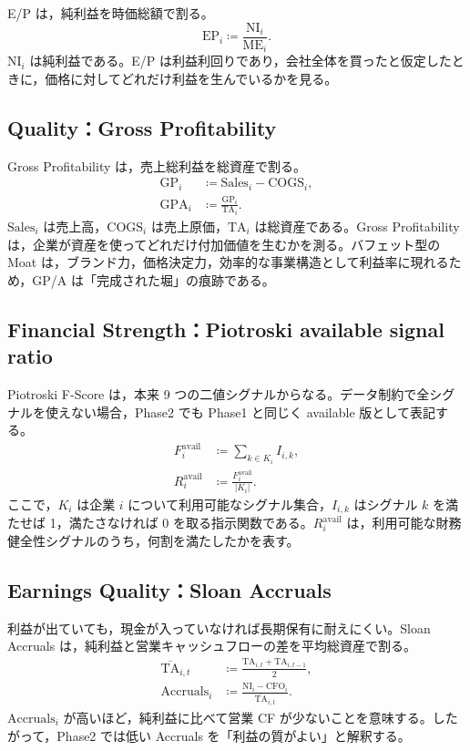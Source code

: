 \documentclass[a4paper,10pt]{article}
\newcommand{\metric}[1]{\mathrm{#1}}
\begin{document}
E/P は，純利益を時価総額で割る。
\begin{equation}
\metric{EP}_i \coloneqq \frac{\metric{NI}_i}{\metric{ME}_i} .
\end{equation}
$\metric{NI}_i$ は純利益である。E/P は利益利回りであり，会社全体を買ったと仮定したときに，価格に対してどれだけ利益を生んでいるかを見る。

\subsection{Quality：Gross Profitability}
Gross Profitability は，売上総利益を総資産で割る。
\begin{align}
\metric{GP}_i &\coloneqq \metric{Sales}_i - \metric{COGS}_i, \\
\metric{GPA}_i &\coloneqq \frac{\metric{GP}_i}{\metric{TA}_i} .
\end{align}
$\metric{Sales}_i$ は売上高，$\metric{COGS}_i$ は売上原価，$\metric{TA}_i$ は総資産である。Gross Profitability は，企業が資産を使ってどれだけ付加価値を生むかを測る。バフェット型の Moat は，ブランド力，価格決定力，効率的な事業構造として利益率に現れるため，GP/A は「完成された堀」の痕跡である。

\subsection{Financial Strength：Piotroski available signal ratio}
Piotroski F-Score は，本来 9 つの二値シグナルからなる。データ制約で全シグナルを使えない場合，Phase2 でも Phase1 と同じく available 版として表記する。
\begin{align}
F^{\mathrm{avail}}_i &\coloneqq \sum_{k\in K_i} I_{i,k}, \\
R^{\mathrm{avail}}_i &\coloneqq \frac{F^{\mathrm{avail}}_i}{|K_i|} .
\end{align}
ここで，$K_i$ は企業 $i$ について利用可能なシグナル集合，$I_{i,k}$ はシグナル $k$ を満たせば 1，満たさなければ 0 を取る指示関数である。$R^{\mathrm{avail}}_i$ は，利用可能な財務健全性シグナルのうち，何割を満たしたかを表す。

\subsection{Earnings Quality：Sloan Accruals}
利益が出ていても，現金が入っていなければ長期保有に耐えにくい。Sloan Accruals は，純利益と営業キャッシュフローの差を平均総資産で割る。
\begin{align}
\overline{\metric{TA}}_{i,t} &\coloneqq \frac{\metric{TA}_{i,t}+\metric{TA}_{i,t-1}}{2}, \\
\metric{Accruals}_i &\coloneqq \frac{\metric{NI}_i - \metric{CFO}_i}{\overline{\metric{TA}}_{i,t}} .
\end{align}
$\metric{Accruals}_i$ が高いほど，純利益に比べて営業 CF が少ないことを意味する。したがって，Phase2 では低い Accruals を「利益の質がよい」と解釈する。
\end{document}
